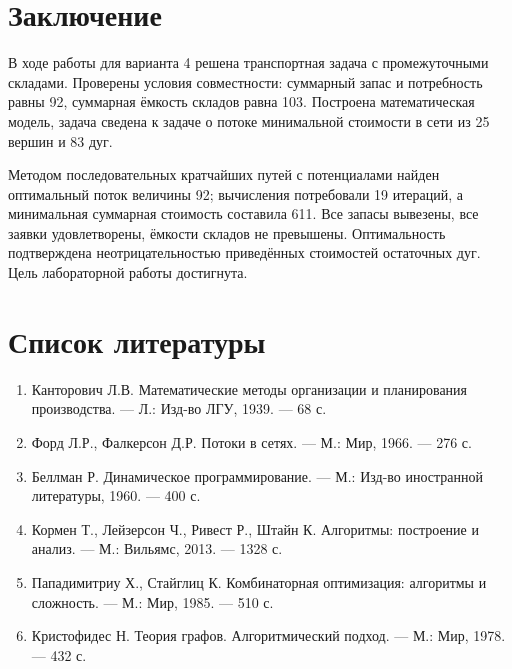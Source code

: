 \clearpage

\section{Заключение}

В ходе работы для варианта 4 решена транспортная задача с промежуточными
складами. Проверены условия совместности: суммарный запас и потребность
равны 92, суммарная ёмкость складов равна 103. Построена математическая
модель, задача сведена к задаче о потоке минимальной стоимости в сети из
25 вершин и 83 дуг.

Методом последовательных кратчайших путей с потенциалами найден
оптимальный поток величины 92; вычисления потребовали 19 итераций, а
минимальная суммарная стоимость составила 611. Все запасы вывезены, все
заявки удовлетворены, ёмкости складов не превышены. Оптимальность
подтверждена неотрицательностью приведённых стоимостей остаточных дуг.
Цель лабораторной работы достигнута.

\section{Список литературы}

\begin{enumerate}
    \item Канторович Л.В. Математические методы организации и планирования
          производства. --- Л.: Изд-во ЛГУ, 1939. --- 68 с.
    \item Форд Л.Р., Фалкерсон Д.Р. Потоки в сетях. --- М.: Мир, 1966. ---
          276 с.
    \item Беллман Р. Динамическое программирование. --- М.: Изд-во
          иностранной литературы, 1960. --- 400 с.
    \item Кормен Т., Лейзерсон Ч., Ривест Р., Штайн К. Алгоритмы:
          построение и анализ. --- М.: Вильямс, 2013. --- 1328 с.
    \item Пападимитриу Х., Стайглиц К. Комбинаторная оптимизация: алгоритмы
          и сложность. --- М.: Мир, 1985. --- 510 с.
    \item Кристофидес Н. Теория графов. Алгоритмический подход. --- М.: Мир,
          1978. --- 432 с.
\end{enumerate}
